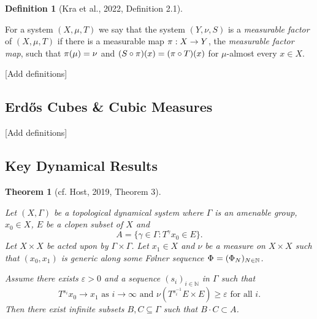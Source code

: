 \documentclass[
  british,
]{article}
\theoremstyle{definition}
\newtheorem{definition}{Definition}[section]
\theoremstyle{plain}
\theoremstyle{plain}
\newtheorem{theorem}{Theorem}[section]
\theoremstyle{plain}
\theoremstyle{remark}
\newcommand{\AmenableGroup}{{\Gamma}}
\newcommand{\AmenableGroupElement}{{\gamma}}
\newcommand{\Folner}[1][\vphantom{}]{{\Phi}_{#1}}
\newcommand{\GroupAction}[2]{T^{#1}{#2}}
\newcommand{\GroupOperation}[2]{{#1}\cdot{#2}}
\newcommand{\Measure}{{\mu}}
\newcommand{\N}{\mathbb{N}}
\newcommand{\ProjectionMap}[1][\vphantom{}]{{\pi}_{#1}}
\begin{document}
\begin{definition}[{Kra et al., 2022, Definition
2.1}]\protect\hypertarget{def-MeasurableFactorCopy}{}\label{def-MeasurableFactorCopy}

For a system \((X,\Measure,T)\) we say that the system \((Y,\nu,S)\) is
a \emph{measurable factor} of \((X,\Measure,T)\) if there is a
measurable map \(\ProjectionMap:X\rightarrow Y\), the \emph{measurable
factor map}, such that \(\ProjectionMap(\Measure)=\nu\) and
\((S\circ\ProjectionMap)(x)=(\ProjectionMap\circ T)(x)\) for
\(\Measure\)-almost every \(x\in X\).

\end{definition}

{[}Add definitions{]}

\subsection{Erdős Cubes \& Cubic
Measures}\label{erdux151s-cubes-cubic-measures}

{[}Add definitions{]}

\subsection{Key Dynamical Results}\label{key-dynamical-results}

\begin{theorem}[{cf. Host, 2019, Theorem
3}]\protect\hypertarget{thm-GenErdosConjDyn}{}\label{thm-GenErdosConjDyn}

Let \((X,\AmenableGroup)\) be a topological dynamical system where
\(\AmenableGroup\) is an amenable group, \(x_0\in X\), \(E\) be a clopen
subset of \(X\) and
\[A=\{\AmenableGroupElement\in\AmenableGroup:\GroupAction{\AmenableGroupElement}{x_0}\in E\}.\]
Let \(X\times X\) be acted upon by
\(\AmenableGroup\times\AmenableGroup\). Let \(x_1\in X\) and \(\nu\) be
a measure on \(X\times X\) such that \((x_0,x_1)\) is generic along some
Følner sequence \(\Folner=(\Folner[N])_{N\in\N}\).

Assume there exists \(\varepsilon>0\) and a sequence \((s_i)_{i\in\N}\)
in \(\AmenableGroup\) such that
\[\GroupAction{s_i}{x_0}\rightarrow x_1\text{ as }i\rightarrow\infty\text{ and }\nu(\GroupAction{s_i^{-1}}{E}\times E)\geq\varepsilon\text{ for all }i. \]
Then there exist infinite subsets \(B,C\subseteq \AmenableGroup\) such
that \(\GroupOperation{B}{C}\subset A\).

\end{theorem}
\end{document}
